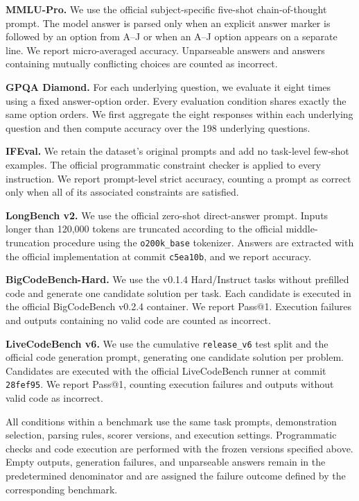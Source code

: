 \textbf{MMLU-Pro.}
We use the official subject-specific five-shot chain-of-thought prompt. The model answer is parsed only when an explicit answer marker is followed by an option from A--J or when an A--J option appears on a separate line. We report micro-averaged accuracy. Unparseable answers and answers containing mutually conflicting choices are counted as incorrect.

\textbf{GPQA Diamond.}
For each underlying question, we evaluate it eight times using a fixed answer-option order. Every evaluation condition shares exactly the same option orders. We first aggregate the eight responses within each underlying question and then compute accuracy over the 198 underlying questions.

\textbf{IFEval.}
We retain the dataset's original prompts and add no task-level few-shot examples.
The official programmatic constraint checker is applied to every instruction. We report prompt-level strict accuracy, counting a prompt as correct only when all of its associated constraints are satisfied.

\textbf{LongBench v2.}
We use the official zero-shot direct-answer prompt. Inputs longer than 120,000 tokens are truncated according to the official middle-truncation procedure using the \texttt{o200k\_base} tokenizer. Answers are extracted with the official implementation at commit \texttt{c5ea10b}, and we report accuracy.

\textbf{BigCodeBench-Hard.}
We use the v0.1.4 Hard/Instruct tasks without prefilled code and generate one candidate solution per task. Each candidate is executed in the official BigCodeBench v0.2.4 container. We report Pass@1.
Execution failures and outputs containing no valid code are counted as incorrect.

\textbf{LiveCodeBench v6.}
We use the cumulative \texttt{release\_v6} test split and the official code generation prompt, generating one candidate solution per problem.
Candidates are executed with the official LiveCodeBench runner at commit \texttt{28fef95}.
We report Pass@1, counting execution failures and outputs without valid code as incorrect.

All conditions within a benchmark use the same task prompts, demonstration selection, parsing rules, scorer versions, and execution settings.
Programmatic checks and code execution are performed with the frozen versions
specified above. Empty outputs, generation failures, and unparseable answers remain in the predetermined denominator and are assigned the failure outcome defined by the corresponding benchmark.

